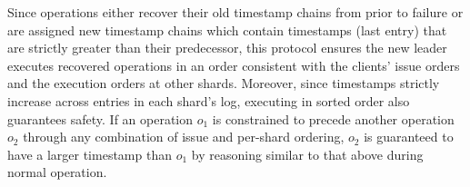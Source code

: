 Since operations either recover their old timestamp chains from prior to failure or are assigned new timestamp chains which contain timestamps (last entry) that are strictly greater than their predecessor, this protocol ensures the new leader executes recovered operations
in an order consistent with the clients' issue orders and the execution orders at other shards. Moreover, since timestamps strictly increase across entries in each shard's log, executing in sorted order also guarantees safety. If an operation $o_1$ is constrained to precede another operation $o_2$ through any combination of issue and per-shard ordering, $o_2$
is guaranteed to have a larger timestamp than $o_1$ by reasoning similar to that above during normal operation. 











